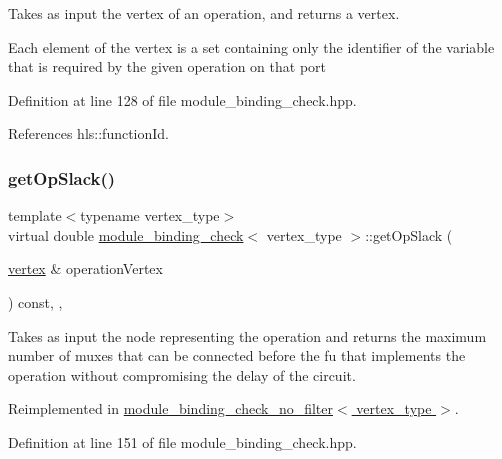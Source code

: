 Takes as input the vertex of an operation, and returns a vertex. 

Each element of the vertex is a set containing only the identifier of the variable that is required by the given operation on that port 

Definition at line 128 of file module\+\_\+binding\+\_\+check.\+hpp.



References hls\+::function\+Id.

\mbox{\label{structmodule__binding__check_a646dd22cb75e1b178f4291587d628721}} 
\subsubsection{\texorpdfstring{get\+Op\+Slack()}{getOpSlack()}}
{\footnotesize\ttfamily template$<$typename vertex\+\_\+type$>$ \\
virtual double \hyperlink{structmodule__binding__check}{module\+\_\+binding\+\_\+check}$<$ vertex\+\_\+type $>$\+::get\+Op\+Slack (\begin{DoxyParamCaption}\item[{\hyperlink{graph_8hpp_abefdcf0544e601805af44eca032cca14}{vertex} \&}]{operation\+Vertex }\end{DoxyParamCaption}) const\hspace{0.3cm}{\ttfamily [inline]}, {\ttfamily [protected]}, {\ttfamily [virtual]}}



Takes as input the node representing the operation and returns the maximum number of muxes that can be connected before the fu that implements the operation without compromising the delay of the circuit. 



Reimplemented in \hyperlink{structmodule__binding__check__no__filter_a13a56954ea41ba112ee9d4ad3f709ed8}{module\+\_\+binding\+\_\+check\+\_\+no\+\_\+filter$<$ vertex\+\_\+type $>$}.



Definition at line 151 of file module\+\_\+binding\+\_\+check.\+hpp.

\mbox{\label{structmodule__binding__check_ac6f4b1e840b4bd490be992756f3c8c0e}} 
